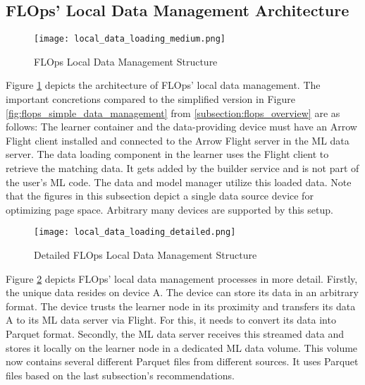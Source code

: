 \subsection{FLOps' Local Data Management Architecture}
\begin{figure}[h]
    \begin{adjustwidth}{-0.1\paperwidth}{-0.1\paperwidth}
        \centering
        \texttt{[image: local\_data\_loading\_medium.png]}
        \caption{FLOps Local Data Management Structure}
        \label{fig:medium_local_data_management}
    \end{adjustwidth}
\end{figure}
Figure \ref{fig:medium_local_data_management} depicts the architecture of FLOps' local data management.
The important concretions compared to the simplified version in Figure \ref{fig:flops_simple_data_management} from \ref{subsection:flops_overview} are as follows:
The learner container and the data-providing device must have an Arrow Flight client installed and connected to the Arrow Flight server in the ML data server.
The data loading component in the learner uses the Flight client to retrieve the matching data.
It gets added by the builder service and is not part of the user's ML code.
The data and model manager utilize this loaded data.
Note that the figures in this subsection depict a single data source device for optimizing page space.
Arbitrary many devices are supported by this setup.

\begin{figure}[p]
    \begin{adjustwidth}{-0.1\paperwidth}{-0.1\paperwidth}
        \centering
        \texttt{[image: local\_data\_loading\_detailed.png]}
        \caption{Detailed FLOps Local Data Management Structure}
        \label{fig:detailed_local_data_management}
    \end{adjustwidth}
\end{figure}
Figure \ref{fig:detailed_local_data_management} depicts FLOps' local data management processes in more detail.
Firstly, the unique data resides on device A.
The device can store its data in an arbitrary format.
The device trusts the learner node in its proximity and transfers its data A to its ML data server via Flight.
For this, it needs to convert its data into Parquet format.
Secondly, the ML data server receives this streamed data and stores it locally on the learner node in a dedicated ML data volume.
This volume now contains several different Parquet files from different sources.
It uses Parquet files based on the last subsection's recommendations.

